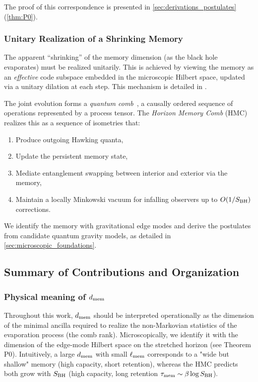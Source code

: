 \documentclass[11pt,a4paper]{article}
\newcommand{\HMC}{\textsc{HMC}\xspace}
\theoremstyle{plain}
\theoremstyle{definition}
\theoremstyle{remark}
\begin{document}
The proof of this correspondence is presented in \cref{sec:derivations_postulates} (\cref{thm:P0}).

\subsubsection{Unitary Realization of a Shrinking Memory}
The apparent ``shrinking'' of the memory dimension (as the black hole evaporates) must be realized unitarily. This is achieved by viewing the memory as an \emph{effective} code subspace embedded in the microscopic Hilbert space, updated via a unitary dilation at each step. This mechanism is detailed in .

The joint evolution forms a \emph{quantum comb}~\cite{Chiribella:2009, Pollock:2018}, a causally ordered sequence of operations represented by a process tensor. The \emph{Horizon Memory Comb} (\HMC{}) realizes this as a sequence of isometries that:
\begin{enumerate}
    \item Produce outgoing Hawking quanta,
    \item Update the persistent memory state,
    \item Mediate entanglement swapping between interior and exterior via the memory,
    \item Maintain a locally Minkowski vacuum for infalling observers up to $O(1/S_{\rm BH})$ corrections.
\end{enumerate}
We identify the memory with gravitational edge modes and derive the postulates from candidate quantum gravity models, as detailed in \cref{sec:microscopic_foundations}.

\subsection{Summary of Contributions and Organization}
\label{sec:contributions}

\subsubsection{Physical meaning of $d_{\rm mem}$}
Throughout this work, $d_{\rm mem}$ should be interpreted operationally as the dimension of the minimal ancilla required to realize the non-Markovian statistics of the evaporation process (the comb rank).
Microscopically, we identify it with the dimension of the edge-mode Hilbert space on the stretched horizon (see Theorem P0).
Intuitively, a large $d_{\rm mem}$ with small $\ell_{\rm mem}$ corresponds to a "wide but shallow" memory (high capacity, short retention), whereas the HMC predicts both grow with $S_{\rm BH}$ (high capacity, long retention $\tau_{\rm mem}\sim \beta \log S_{\rm BH}$).
\end{document}
